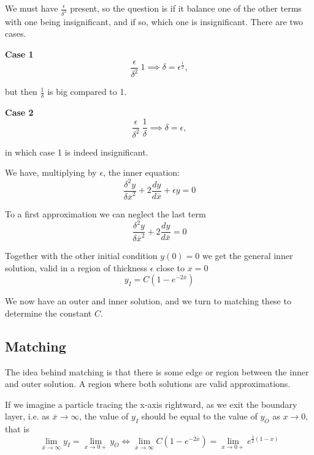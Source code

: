 \documentclass[12pt]{article}
\begin{document}
We must have $\frac{\epsilon}{\delta^2}$ present, so the question is if it
balance one of the other terms with one being insignificant, and if so, which one
is insignificant. There are two cases.

\textbf{Case 1}
\begin{equation}
\frac{\epsilon}{\delta^2} ~ 1 \implies \delta = \epsilon^{\frac{1}{2}},
\end{equation}

but then $\frac{1}{\delta}$ is big compared to 1.

\textbf{Case 2}
\begin{equation}
\frac{\epsilon}{\delta^2} ~ \frac{1}{\delta} \implies \delta = \epsilon,
\end{equation}

in which case 1 is indeed insignificant.

We have, multiplying by $\epsilon$, the inner equation:
\begin{equation}
\frac{\delta^2 y}{\delta \overline{x}^2} + 2 \frac{dy}{d\overline{x}} + \epsilon
y = 0
\end{equation}

To a first approximation we can neglect the last term
\begin{equation}
\frac{\delta^2 y}{\delta \overline{x}^2} + 2 \frac{dy}{d\overline{x}} = 0
\end{equation}

Together with the other initial condition $y(0)=0$ we get the general inner
solution, valid in a region of thickness $\epsilon$ close to $x=0$
\begin{equation}
y_I = C(1 - e^{-2\overline{x}})
\end{equation}

We now have an outer and inner solution, and we turn to matching these to
determine the constant $C$.

\subsection{Matching}

The idea behind matching is that there is some edge or region between the inner
and outer solution. A region where both solutions are valid approximations.

If we imagine a particle tracing the x-axis rightward, as we exit the boundary
layer, i.e. as $\overline{x} \to \infty$, the value of $y_I$ should be equal to
the value of $y_O$ as $x \to 0$, that is
\begin{equation}
\lim_{\overline{x} \to \infty} y_I = \lim_{x\to 0+} y_O \iff 
\lim_{\overline{x} \to \infty} C(1 - e^{-2\overline{x}}) = \lim_{x \to 0+} e^{\frac{1}{2}(1-x)}
\end{equation}
\end{document}
